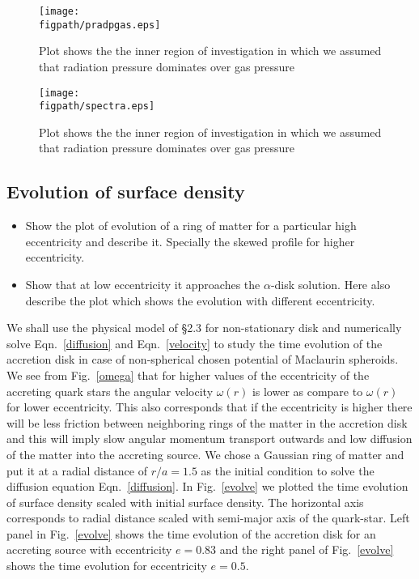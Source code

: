 \documentclass[useAMS,usenatbib]{mn2e}
\newcommand{\figpath}{./Figs/}
\begin{document}
\begin{figure}
\centering
\texttt{[image: \\figpath/pradpgas.eps]}
\caption{Plot shows the the inner region of investigation in which we assumed that radiation pressure dominates over gas pressure}
\label{prpg}
\end{figure}
\begin{figure}
\centering
\texttt{[image: \\figpath/spectra.eps]}
\caption{Plot shows the the inner region of investigation in which we assumed that radiation pressure dominates over gas pressure}
\label{spectra}
\end{figure}
\subsection{Evolution of surface density}
\begin{itemize}
\item Show the plot of evolution of a ring of matter for a particular high
  eccentricity and describe it. Specially the skewed profile for
  higher eccentricity. 
\item Show that at low eccentricity it approaches the $\alpha$-disk
  solution. Here also describe the plot which shows the evolution with
  different eccentricity. 
\end{itemize}
We shall use the physical model of \S2.3 for non-stationary disk and numerically solve Eqn.~\ref{diffusion} and Eqn.~\ref{velocity} to study the time evolution of the accretion disk in case of non-spherical chosen potential of Maclaurin spheroids. We see from Fig.~\ref{omega} that for higher values of the eccentricity of the accreting quark stars the angular velocity $\omega(r)$ is lower as compare to $\omega(r)$ for lower eccentricity. This also corresponds that if the eccentricity is higher there will be less friction between neighboring rings of the matter in the accretion disk and this will imply slow angular momentum transport outwards and low diffusion of the matter into the accreting source. We chose a Gaussian ring of matter and put it at a radial distance of $r/a = 1.5$ as the initial condition to solve the diffusion equation Eqn.~\ref{diffusion}. In Fig.~\ref{evolve} we plotted the time evolution of surface density scaled with initial surface density. The horizontal axis corresponds to radial distance scaled with semi-major axis of the quark-star. Left panel in Fig.~\ref{evolve} shows the time evolution of the accretion disk for an accreting source with eccentricity $e = 0.83$ and the right panel of Fig.~\ref{evolve} shows the time evolution for eccentricity $e = 0.5$. 
\end{document}
